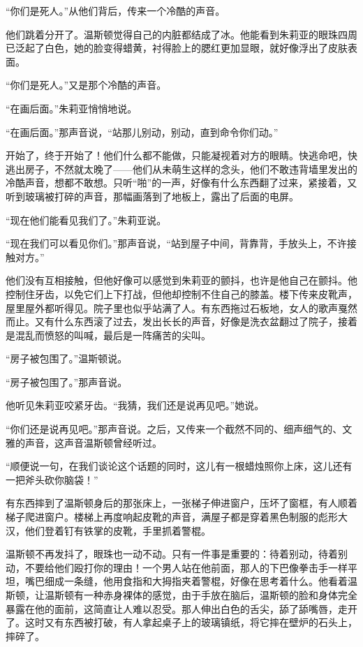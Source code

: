 ``你们是死人。''从他们背后，传来一个冷酷的声音。

他们跳着分开了。温斯顿觉得自己的内脏都结成了冰。他能看到朱莉亚的眼珠四周已泛起了白色，她的脸变得蜡黄，衬得脸上的腮红更加显眼，就好像浮出了皮肤表面。

``你们是死人。''又是那个冷酷的声音。

``在画后面。''朱莉亚悄悄地说。

``在画后面。''那声音说，``站那儿别动，别动，直到命令你们动。''

开始了，终于开始了！他们什么都不能做，只能凝视着对方的眼睛。快逃命吧，快逃出房子，不然就太晚了——他们从未萌生这样的念头，他们不敢违背墙里发出的冷酷声音，想都不敢想。只听``啪''的一声，好像有什么东西翻了过来，紧接着，又听到玻璃被打碎的声音，那幅画落到了地板上，露出了后面的电屏。

``现在他们能看见我们了。''朱莉亚说。

``现在我们可以看见你们。''那声音说，``站到屋子中间，背靠背，手放头上，不许接触对方。''

他们没有互相接触，但他好像可以感觉到朱莉亚的颤抖，也许是他自己在颤抖。他控制住牙齿，以免它们上下打战，但他却控制不住自己的膝盖。楼下传来皮靴声，屋里屋外都听得见。院子里也似乎站满了人。有东西拖过石板地，女人的歌声戛然而止。又有什么东西滚了过去，发出长长的声音，好像是洗衣盆翻过了院子，接着是混乱而愤怒的叫喊，最后是一阵痛苦的尖叫。

``房子被包围了。''温斯顿说。

``房子被包围了。''那声音说。

他听见朱莉亚咬紧牙齿。``我猜，我们还是说再见吧。''她说。

``你们还是说再见吧。''那声音说。之后，又传来一个截然不同的、细声细气的、文雅的声音，这声音温斯顿曾经听过。

``顺便说一句，在我们谈论这个话题的同时，这儿有一根蜡烛照你上床，这儿还有一把斧头砍你脑袋！''

有东西摔到了温斯顿身后的那张床上，一张梯子伸进窗户，压坏了窗框，有人顺着梯子爬进窗户。楼梯上再度响起皮靴的声音，满屋子都是穿着黑色制服的彪形大汉，他们登着钉有铁掌的皮靴，手里抓着警棍。

温斯顿不再发抖了，眼珠也一动不动。只有一件事是重要的：待着别动，待着别动，不要给他们殴打你的理由！一个男人站在他前面，那人的下巴像拳击手一样平坦，嘴巴细成一条缝，他用食指和大拇指夹着警棍，好像在思考着什么。他看着温斯顿，让温斯顿有一种赤身裸体的感觉，由于手放在脑后，温斯顿的脸和身体完全暴露在他的面前，这简直让人难以忍受。那人伸出白色的舌尖，舔了舔嘴唇，走开了。这时又有东西被打破，有人拿起桌子上的玻璃镇纸，将它摔在壁炉的石头上，摔碎了。

